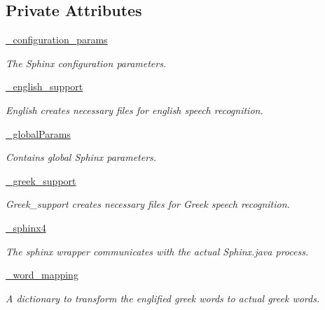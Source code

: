 \subsection*{Private Attributes}
\begin{DoxyCompactItemize}
\item 
\hyperlink{classrapp__speech__detection__sphinx4_1_1speech__recognition__sphinx4_1_1SpeechRecognitionSphinx4_ab6a1a99c38bcc6938c0f0a39dd355a04}{\-\_\-configuration\-\_\-params}
\begin{DoxyCompactList}\small\item\em The Sphinx configuration parameters. \end{DoxyCompactList}\item 
\hyperlink{classrapp__speech__detection__sphinx4_1_1speech__recognition__sphinx4_1_1SpeechRecognitionSphinx4_ad506f14432d9452c85b900d79e03c589}{\-\_\-english\-\_\-support}
\begin{DoxyCompactList}\small\item\em English creates necessary files for english speech recognition. \end{DoxyCompactList}\item 
\hyperlink{classrapp__speech__detection__sphinx4_1_1speech__recognition__sphinx4_1_1SpeechRecognitionSphinx4_a530d829504b888823d2e72dafc3ba36c}{\-\_\-global\-Params}
\begin{DoxyCompactList}\small\item\em Contains global Sphinx parameters. \end{DoxyCompactList}\item 
\hyperlink{classrapp__speech__detection__sphinx4_1_1speech__recognition__sphinx4_1_1SpeechRecognitionSphinx4_a4647fa82a552fe670b70550c5e66a253}{\-\_\-greek\-\_\-support}
\begin{DoxyCompactList}\small\item\em Greek\-\_\-support creates necessary files for Greek speech recognition. \end{DoxyCompactList}\item 
\hyperlink{classrapp__speech__detection__sphinx4_1_1speech__recognition__sphinx4_1_1SpeechRecognitionSphinx4_a01424766fb7384f6d005f4be78725af4}{\-\_\-sphinx4}
\begin{DoxyCompactList}\small\item\em The sphinx wrapper communicates with the actual Sphinx.\-java process. \end{DoxyCompactList}\item 
\hyperlink{classrapp__speech__detection__sphinx4_1_1speech__recognition__sphinx4_1_1SpeechRecognitionSphinx4_a752dac4e406d54c3f27db026dca60334}{\-\_\-word\-\_\-mapping}
\begin{DoxyCompactList}\small\item\em A dictionary to transform the englified greek words to actual greek words. \end{DoxyCompactList}\end{DoxyCompactItemize}


